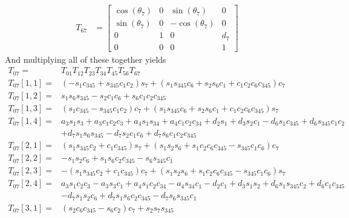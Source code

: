 \documentclass[onecolumn,10pt]{jhwhw}
\begin{document}
\begin{align*}
T_{67} &=
\left[\begin{matrix}\cos{\left (\theta_{7} \right )} & 0 & \sin{\left (\theta_{7} \right )} & 0\\\sin{\left (\theta_{7} \right )} & 0 & - \cos{\left (\theta_{7} \right )} & 0\\0 & 1 & 0 & d_{7}\\0 & 0 & 0 & 1\end{matrix}\right]
\end{align*}
And multiplying all of these together yields
\begin{align*}
T_{07} =& T_{01} T_{12} T_{23} T_{34} T_{45} T_{56} T_{67} \\
T_{07}[1, 1] =& \left(- s_{1} c_{345} + s_{345} c_{1} c_{2}\right) s_{7} + \left(s_{1} s_{345} c_{6} + s_{2} s_{6} c_{1} + c_{1} c_{2} c_{6} c_{345}\right) c_{7} \\
T_{07}[1, 2] =& s_{1} s_{6} s_{345} - s_{2} c_{1} c_{6} + s_{6} c_{1} c_{2} c_{345} \\
T_{07}[1, 3] =& \left(s_{1} c_{345} - s_{345} c_{1} c_{2}\right) c_{7} + \left(s_{1} s_{345} c_{6} + s_{2} s_{6} c_{1} + c_{1} c_{2} c_{6} c_{345}\right) s_{7} \\
T_{07}[1, 4] =& a_{3} s_{1} s_{3} + a_{3} c_{1} c_{2} c_{3} + a_{4} s_{1} s_{34} + a_{4} c_{1} c_{2} c_{34} + d_{2} s_{1} + d_{3} s_{2} c_{1} - d_{6} s_{1} c_{345} + d_{6} s_{345} c_{1} c_{2} \\
              & + d_{7} s_{1} s_{6} s_{345} - d_{7} s_{2} c_{1} c_{6} + d_{7} s_{6} c_{1} c_{2} c_{345} \\
T_{07}[2, 1] =& \left(s_{1} s_{345} c_{2} + c_{1} c_{345}\right) s_{7} + \left(s_{1} s_{2} s_{6} + s_{1} c_{2} c_{6} c_{345} - s_{345} c_{1} c_{6}\right) c_{7} \\
T_{07}[2, 2] =& - s_{1} s_{2} c_{6} + s_{1} s_{6} c_{2} c_{345} - s_{6} s_{345} c_{1} \\
T_{07}[2, 3] =& - \left(s_{1} s_{345} c_{2} + c_{1} c_{345}\right) c_{7} + \left(s_{1} s_{2} s_{6} + s_{1} c_{2} c_{6} c_{345} - s_{345} c_{1} c_{6}\right) s_{7} \\
T_{07}[2, 4] =& a_{3} s_{1} c_{2} c_{3} - a_{3} s_{3} c_{1} + a_{4} s_{1} c_{2} c_{34} - a_{4} s_{34} c_{1} - d_{2} c_{1} + d_{3} s_{1} s_{2} + d_{6} s_{1} s_{345} c_{2} + d_{6} c_{1} c_{345} \\
              & - d_{7} s_{1} s_{2} c_{6} + d_{7} s_{1} s_{6} c_{2} c_{345} - d_{7} s_{6} s_{345} c_{1} \\
T_{07}[3, 1] =& \left(s_{2} c_{6} c_{345} - s_{6} c_{2}\right) c_{7} + s_{2} s_{7} s_{345} \\

\end{align*}
\end{document}
